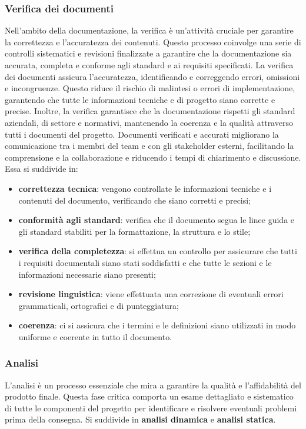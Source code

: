 \subsubsection{Verifica dei documenti} \label{verifica_dei_documenti}
Nell'ambito della documentazione, la verifica è un'attività cruciale per garantire la correttezza e l'accuratezza dei contenuti. Questo processo coinvolge una serie di controlli sistematici e revisioni finalizzate a garantire che la documentazione sia accurata, completa e conforme agli standard e ai requisiti specificati.
La verifica dei documenti assicura l'accuratezza, identificando e correggendo errori, omissioni e incongruenze. Questo riduce il rischio di malintesi o errori di implementazione, garantendo che tutte le informazioni tecniche e di progetto siano corrette e precise.
Inoltre, la verifica garantisce che la documentazione rispetti gli standard aziendali, di settore e normativi, mantenendo la coerenza e la qualità attraverso tutti i documenti del progetto. Documenti verificati e accurati migliorano la comunicazione tra i membri del team e con gli stakeholder esterni, facilitando la comprensione e la collaborazione e riducendo i tempi di chiarimento e discussione. Essa si suddivide in:
\begin{itemize}
	\item \textbf{correttezza tecnica}: vengono controllate le informazioni tecniche e i contenuti del documento, verificando che siano corretti e precisi;
	\item \textbf{conformità agli standard}: verifica che il documento segua le linee guida e gli standard stabiliti per la formattazione, la struttura e lo stile;
	\item \textbf{verifica della completezza}: si effettua un controllo per assicurare che tutti i requisiti documentali siano stati soddisfatti e che  tutte le sezioni e le informazioni necessarie siano presenti;
	\item \textbf{revisione linguistica}: viene effettuata una correzione di eventuali errori grammaticali, ortografici e di punteggiatura;
	\item \textbf{coerenza}: ci si assicura che i termini e le definizioni siano utilizzati in modo uniforme e coerente in tutto il documento.
\end{itemize}

\subsubsection{Analisi}
L'analisi è un processo essenziale che mira a garantire la qualità e l'affidabilità del prodotto finale. Questa fase critica comporta un esame dettagliato e sistematico di tutte le componenti del progetto per identificare e risolvere eventuali problemi prima della consegna. Si suddivide in \textbf{analisi dinamica} e \textbf{analisi statica}.

